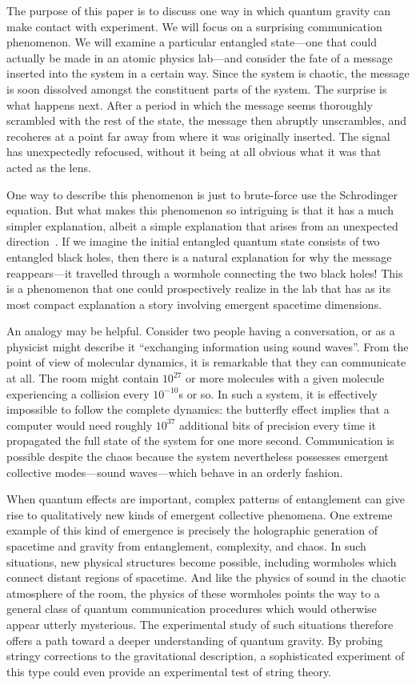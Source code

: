 \documentclass[aps,pra,reprint,floatfix,superscriptaddress, nofootinbib,longbibliography,onecolumn,notitlepage,12pt, tightenlines]{revtex4-1}
\begin{document}
The purpose of this paper is to discuss one way in which quantum gravity can make contact with experiment. We will focus on a surprising communication phenomenon. We will examine a particular entangled state---one that could actually be made in an atomic physics lab---and consider the fate of a message inserted into the system in a certain way. Since the system is chaotic, the message is soon dissolved amongst the constituent parts of the system. The surprise is what happens next. After a period in which the message seems thoroughly scrambled with the rest of the state, the message then abruptly unscrambles, and recoheres at a point far away from where it was originally inserted. The signal has unexpectedly refocused, without it being at all obvious what it was that acted as the lens.

One way to describe this phenomenon is just to brute-force use the Schrodinger equation. But what makes this phenomenon so intriguing is that it has a much simpler explanation, albeit a simple explanation that arises from an unexpected direction~\cite{gao2017traversable}. If we imagine the initial entangled quantum state consists of two entangled black holes, then there is a natural explanation for why the message reappears---it travelled through a wormhole connecting the two black holes! This is a phenomenon that one could prospectively realize in the lab that has as its most compact explanation a story involving emergent spacetime dimensions.

An analogy may be helpful. Consider two people having a conversation, or as a physicist might describe it ``exchanging information using sound waves''. From the point of view of molecular dynamics, it is remarkable that they can communicate at all. The room might contain $10^{27}$ or more molecules with a given molecule experiencing a collision every $10^{-10}$s or so. In such a system, it is effectively impossible to follow the complete dynamics: the butterfly effect implies that a computer would need roughly $10^{37}$ additional bits of precision every time it propagated the full state of the system for one more second. Communication is possible despite the chaos because the system nevertheless possesses emergent collective modes---sound waves---which behave in an orderly fashion.

When quantum effects are important, complex patterns of entanglement can give rise to qualitatively new kinds of emergent collective phenomena. One extreme example of this kind of emergence is precisely the holographic generation of spacetime and gravity from entanglement, complexity, and chaos. In such situations, new physical structures become possible, including wormholes which connect distant regions of spacetime. And like the physics of sound in the chaotic atmosphere of the room, the physics of these wormholes points the way to a general class of quantum communication procedures which would otherwise appear utterly mysterious. The experimental study of such situations therefore offers a path toward a deeper understanding of quantum gravity. By probing stringy corrections to the gravitational description, a sophisticated experiment of this type could even provide an experimental test of string theory.
\end{document}
